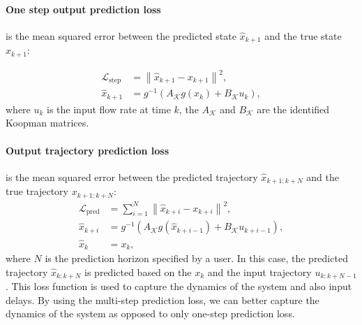\documentclass[conference]{IEEEtran}
\begin{document}
\paragraph*{One step output prediction loss}
is the mean squared error between the predicted state $\hat{x}_{k+1}$ and the true state $x_{k+1}$:

\begin{subequations}
    \begin{align}
        \mathcal{L}_{\text{step}} &= \left\|\hat{x}_{k+1} - x_{k+1}\right\|^2, \\
        \hat{x}_{k+1} &= g^{-1}(A_\mathcal{K}g(x_k) + B_\mathcal{K}u_k),
    \end{align}
\end{subequations}
where $u_k$ is the input flow rate at time $k$, the $A_\mathcal{K}$ and $B_\mathcal{K}$ are the identified Koopman matrices.

\paragraph*{Output trajectory prediction loss}
\label{par:output_loss}
is the mean squared error between the predicted trajectory $\hat{x}_{k+1:k+N}$ and the true trajectory $x_{k+1:k+N}$:
\begin{subequations}
    \begin{align}
        \mathcal{L}_{\text{pred}} &= \sum_{i=1}^{N}\left\|\hat{x}_{k+i} - x_{k+i}\right\|^2, \\
        \hat{x}_{k+i} &= g^{-1}\left(A_\mathcal{K}g(\hat{x}_{k+i-1}) + B_\mathcal{K}u_{k+i-1}\right), \\
        \hat{x}_{k} &= x_{k},
    \end{align}
\end{subequations}
where $N$ is the prediction horizon specified by a user. In this case, the predicted trajectory $\hat{x}_{k:k+N}$ is predicted based on the $x_k$ and the input trajectory $u_{k:k+N-1}$. This loss function is used to capture the dynamics of the system and also input delays. By using the multi-step prediction loss, we can better capture the dynamics of the system as opposed to only one-step prediction loss.
\end{document}
